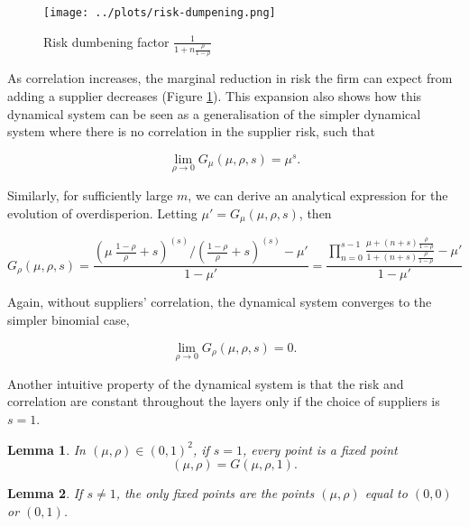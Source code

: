 \documentclass[draft, american, abstract=on]{scrartcl}
\theoremstyle{plain}
\newtheorem{lemma}{Lemma}
\begin{document}
\begin{figure}[H]
  \centering
  \texttt{[image: ../plots/risk-dumpening.png]}
  \caption{Risk dumbening factor $\frac{1}{1 + n \frac{\rho}{1 - \rho}}$}
  \label{fig:risk-dumpening}
\end{figure}

As correlation increases, the marginal reduction in risk the firm can expect from adding a supplier decreases (Figure \ref{fig:risk-dumpening}). This expansion also shows how this dynamical system can be seen as a generalisation of the simpler dynamical system where there is no correlation in the supplier risk, such that

\begin{equation}
  \lim_{\rho \rightarrow 0} G_\mu(\mu, \rho, s) = \mu^s.
\end{equation}

Similarly, for sufficiently large $m$, we can derive an analytical expression for the evolution of overdisperion. Letting $\mu' = G_\mu(\mu, \rho, s)$, then

\begin{equation}
  G_\rho(\mu, \rho, s) = \frac{\left( \mu \  \frac{1 - \rho}{\rho} + s \right)^{(s)} \Big/ \left( \frac{1 - \rho}{\rho} + s \right)^{(s)} - \mu'}{1 - \mu'} = \frac{\prod^{s - 1}_{n = 0} \frac{\mu + (n + s) \frac{\rho}{1 - \rho}}{1 + (n + s) \frac{\rho}{1 - \rho}} - \mu'}{1 - \mu'}
\end{equation}



Again, without suppliers' correlation, the dynamical system converges to the simpler binomial case,

\begin{equation}
  \lim_{\rho \rightarrow 0} G_\rho(\mu, \rho, s) = 0.
\end{equation}

Another intuitive property of the dynamical system is that the risk and correlation are constant throughout the layers only if the choice of suppliers is $s = 1$. 

\begin{lemma}
  In $(\mu, \rho) \in (0, 1)^2$, if $s = 1$, every point is a fixed point \begin{equation}
    (\mu, \rho) = G(\mu, \rho, 1). 
  \end{equation}
\end{lemma}

\begin{lemma}
  If $s \neq 1$, the only fixed points are the points $(\mu, \rho)$ equal to $(0, 0)$  or $(0, 1)$.
\end{lemma}
\end{document}
